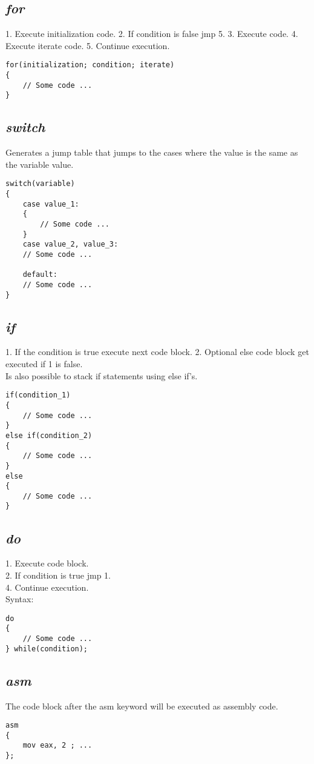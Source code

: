 \documentclass[10pt,a4paper]{article}
\begin{document}
\subsection{\textit{for}}
1. Execute initialization code.
2. If condition is false jmp 5.
3. Execute code.
4. Execute iterate code.
5. Continue execution.
\begin{lstlisting}
for(initialization; condition; iterate)
{
	// Some code ...
}
\end{lstlisting}


\subsection{\textit{switch}}
Generates a jump table that jumps to the cases where the value is the same as the variable value.
\begin{lstlisting}
switch(variable)
{
	case value_1:
	{
		// Some code ...
	}
	case value_2, value_3:
	// Some code ...

	default:
	// Some code ...
}
\end{lstlisting}


\subsection{\textit{if}}
1. If the condition is true execute next code block.
2. Optional else code block get executed if 1 is false. \\
Is also possible to stack if statements using else if's.
\begin{lstlisting}
if(condition_1)
{
	// Some code ...
}
else if(condition_2)
{
	// Some code ...
}
else
{
	// Some code ...
}
\end{lstlisting}


\subsection{\textit{do}}
1. Execute code block. \\
2. If condition is true jmp 1. \\
4. Continue execution. \\
Syntax:
\begin{lstlisting}
do
{
	// Some code ...
} while(condition);
\end{lstlisting}


\subsection{\textit{asm}}
The code block after the asm keyword will be executed as assembly code.
\begin{lstlisting}
asm
{
	mov eax, 2 ; ...
};
\end{lstlisting}
\end{document}
